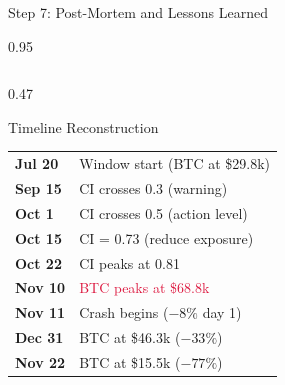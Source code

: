 \documentclass[9pt, aspectratio=169, t]{beamer}
\begin{document}
\begin{frame}{Step 7: Post-Mortem and Lessons Learned}
    \begin{cminipage}{0.95\textwidth}
    {\footnotesize
    \begin{columns}[T]
        \begin{column}{0.47\textwidth}
            \begin{block}{Timeline Reconstruction}
                \begin{tabular}{ll}
                    \textbf{Jul 20} & Window start (BTC at \$29.8k) \\
                    \textbf{Sep 15} & CI crosses 0.3 (warning) \\
                    \textbf{Oct 1} & CI crosses 0.5 (action level) \\
                    \textbf{Oct 15} & CI = 0.73 (reduce exposure) \\
                    \textbf{Oct 22} & CI peaks at 0.81 \\
                    \textbf{Nov 10} & \textcolor{Crimson}{BTC peaks at \$68.8k} \\
                    \textbf{Nov 11} & Crash begins ($-8\%$ day 1) \\
                    \textbf{Dec 31} & BTC at \$46.3k ($-33\%$) \\
                    \textbf{Nov 22} & BTC at \$15.5k ($-77\%$) \\
                \end{tabular}
            \end{block}


\end{column}
\end{columns}}
\end{cminipage}
\end{frame}
\end{document}
